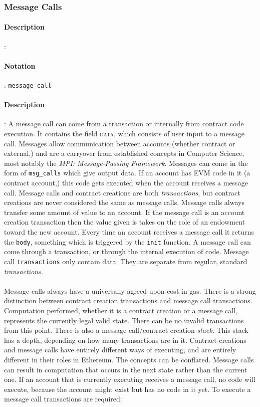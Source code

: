 \documentclass[10pt,a4paper,leqno,bibliography=totoc]{scrartcl}
\newenvironment{alphafootnotes}
{\par\edef\savedfootnotenumber{\number\value{footnote}}
\renewcommand{\thefootnote}{\alph{footnote}}
\setcounter{footnote}{0}}
{\par\setcounter{footnote}{\savedfootnotenumber}}
\begin{document}
\begin{alphafootnotes}
\begin{multicols*}{2}
			\subsubsection{Message Calls}
\paragraph{Description}:\paragraph{Notation}: \texttt{message\_call}
\paragraph{Description}: A message call can come from a transaction or internally from contract code execution. It contains the field \textsc{data}, which consists of user input to a message call.
 Messages allow communication between accounts (whether contract or external,) and are a carryover from established concepts in Computer Science, most notably the \textsl{MPI: Message-Passing Framework}. Messages can come in the form of \texttt{msg\_calls} which give output data. If an account has EVM code in it (a contract account,) this code gets executed when the account receives a message call. Message calls and contract creations are both \textsl{transactions}, but contract creations are never considered the same as message calls. Message calls always transfer some amount of value to an account. If the message call is an account creation transaction then the value given is takes on the role of an endowment toward the new account. Every time an account receives a message call it returns the \texttt{body}, something which is triggered by the \texttt{init} function. A message call can come through a transaction, or through the internal execution of code. Message call \texttt{transactions} only contain data. They are separate from regular, standard \textit{transactions}.

\paragraph{}Message calls always have a universally agreed-upon cost in gas. There is a strong distinction between contract creation transactions and message call transactions. Computation performed, whether it is a contract creation or a message call, represents the currently legal valid state. There can be no invalid transactions from this point. \supercite{Wood2017} There is also a message call/contract creation \textit{stack}. This stack has a depth, depending on how many transactions are in it. Contract creations and message calls have entirely different ways of executing, and are entirely different in their roles in Ethereum. The concepts can be conflated. Message calls can result in computation that occurs in the next state rather than the current one. If an account that is currently executing receives a message call, no code will execute, because the account might exist but has no code in it yet. To execute a message call transactions are required:


\end{multicols*}
\end{alphafootnotes}
\end{document}
